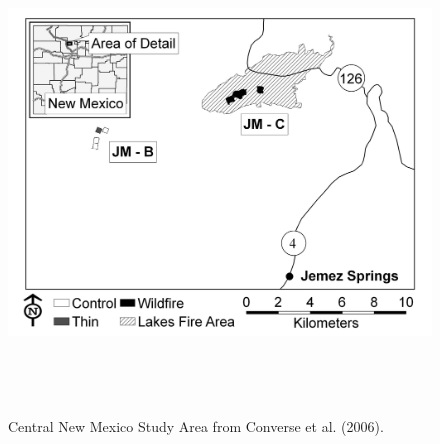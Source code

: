 \begin{figure}
\begin{center}
\includegraphics[height=5in,width=6.6in]{Ch14-Multisession/figs/converse_NM_Overview_4.jpg}
\end{center}
\caption{
Central New Mexico Study Area from Converse et al. (2006).
}
\label{fig.studyarea}
\end{figure}


\clearpage





